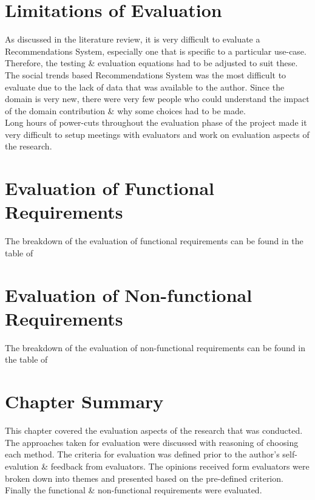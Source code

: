 
\section{Limitations of Evaluation}
As discussed in the literature review, it is very difficult to evaluate a Recommendations System, especially one that is specific to a particular use-case. Therefore, the testing \& evaluation equations had to be adjusted to suit these.
The social trends based Recommendations System was the most difficult to evaluate due to the lack of data that was available to the author.
Since the domain is very new, there were very few people who could understand the impact of the domain contribution \& why some choices had to be made.\\
Long hours of power-cuts throughout the evaluation phase of the project made it very difficult to setup meetings with evaluators and work on evaluation aspects of the research.

\section{Evaluation of Functional Requirements}
The breakdown of the evaluation of functional requirements can be found in the table  of \textbf{}

\section{Evaluation of Non-functional Requirements}
The breakdown of the evaluation of non-functional requirements can be found in the table  of \textbf{}

\section{Chapter Summary}
This chapter covered the evaluation aspects of the research that was conducted. The approaches taken for evaluation were discussed with reasoning of choosing each method. The criteria for evaluation was defined prior to the author's self-evalution \& feedback from evaluators. The opinions received form evaluators were broken down into themes and presented based on the pre-defined criterion. Finally the functional \& non-functional requirements were evaluated.